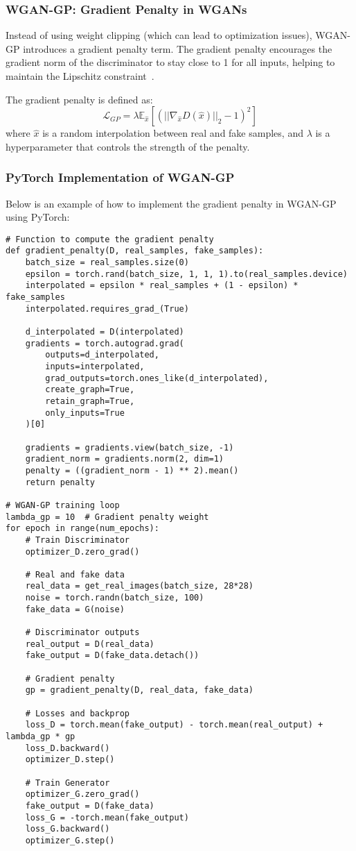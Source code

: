 \subsubsection{WGAN-GP: Gradient Penalty in WGANs}
Instead of using weight clipping (which can lead to optimization issues), WGAN-GP introduces a gradient penalty term. The gradient penalty encourages the gradient norm of the discriminator to stay close to 1 for all inputs, helping to maintain the Lipschitz constraint~\cite{arjovsky2017wasserstein}.

The gradient penalty is defined as:
\[
\mathcal{L}_{GP} = \lambda \mathbb{E}_{\hat{x}} \left[ \left( || \nabla_{\hat{x}} D(\hat{x}) ||_2 - 1 \right)^2 \right]
\]
where \(\hat{x}\) is a random interpolation between real and fake samples, and \(\lambda\) is a hyperparameter that controls the strength of the penalty.

\subsubsection{PyTorch Implementation of WGAN-GP}
Below is an example of how to implement the gradient penalty in WGAN-GP using PyTorch:

\begin{lstlisting}[style=python]
# Function to compute the gradient penalty
def gradient_penalty(D, real_samples, fake_samples):
    batch_size = real_samples.size(0)
    epsilon = torch.rand(batch_size, 1, 1, 1).to(real_samples.device)
    interpolated = epsilon * real_samples + (1 - epsilon) * fake_samples
    interpolated.requires_grad_(True)
    
    d_interpolated = D(interpolated)
    gradients = torch.autograd.grad(
        outputs=d_interpolated,
        inputs=interpolated,
        grad_outputs=torch.ones_like(d_interpolated),
        create_graph=True,
        retain_graph=True,
        only_inputs=True
    )[0]
    
    gradients = gradients.view(batch_size, -1)
    gradient_norm = gradients.norm(2, dim=1)
    penalty = ((gradient_norm - 1) ** 2).mean()
    return penalty

# WGAN-GP training loop
lambda_gp = 10  # Gradient penalty weight
for epoch in range(num_epochs):
    # Train Discriminator
    optimizer_D.zero_grad()
    
    # Real and fake data
    real_data = get_real_images(batch_size, 28*28)
    noise = torch.randn(batch_size, 100)
    fake_data = G(noise)
    
    # Discriminator outputs
    real_output = D(real_data)
    fake_output = D(fake_data.detach())
    
    # Gradient penalty
    gp = gradient_penalty(D, real_data, fake_data)
    
    # Losses and backprop
    loss_D = torch.mean(fake_output) - torch.mean(real_output) + lambda_gp * gp
    loss_D.backward()
    optimizer_D.step()

    # Train Generator
    optimizer_G.zero_grad()
    fake_output = D(fake_data)
    loss_G = -torch.mean(fake_output)
    loss_G.backward()
    optimizer_G.step()
\end{lstlisting}


